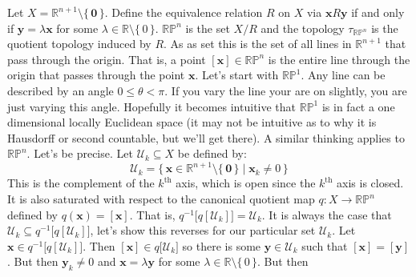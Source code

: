 \documentclass{article}
\theoremstyle{plain}
\theoremstyle{normal}
\newenvironment{example}{%
    \pushQED{\qed}\renewcommand{\qedsymbol}{$\blacksquare$}\examplex%
}{%
    \popQED\endexamplex%
}
\begin{document}
        \begin{example}[\textbf{Real Projective Space}]
            Let $X=\mathbb{R}^{n+1}\setminus\{\,\mathbf{0}\,\}$. Define the
            equivalence relation $R$ on $X$ via $\mathbf{x}R\mathbf{y}$ if and
            only if $\mathbf{y}=\lambda\mathbf{x}$ for some
            $\lambda\in\mathbb{R}\setminus\{\,0\,\}$. $\mathbb{RP}^{n}$ is the
            set $X/R$ and the topology $\tau_{\mathbb{RP}^{n}}$ is the
            quotient topology induced by $R$. As as set this is the set of all
            lines in $\mathbb{R}^{n+1}$ that pass through the origin. That is,
            a point $[\mathbf{x}]\in\mathbb{RP}^{n}$ is the entire line through
            the origin that passes through the point $\mathbf{x}$. Let's start
            with $\mathbb{RP}^{1}$. Any line can be described by an angle
            $0\leq\theta<\pi$. If you vary the line your are on slightly, you
            are just varying this angle. Hopefully it becomes intuitive that
            $\mathbb{RP}^{1}$ is in fact a one dimensional locally Euclidean
            space (it may not be intuitive as to why it is Hausdorff or
            second countable, but we'll get there). A similar thinking applies
            to $\mathbb{RP}^{n}$. Let's be precise. Let
            $\mathcal{U}_{k}\subseteq{X}$ be defined by:
            \begin{equation}
                \mathcal{U}_{k}
                =\{\,\mathbf{x}\in\mathbb{R}^{n+1}\setminus\{\,\mathbf{0}\,\}\;
                    |\;\mathbf{x}_{k}\ne{0}\,\}
            \end{equation}
            This is the complement of the $k^{\textrm{th}}$ axis, which is open
            since the $k^{\textrm{th}}$ axis is closed. It is also saturated
            with respect to the canonical quotient map
            $q:X\rightarrow\mathbb{RP}^{n}$ defined by
            $q(\mathbf{x})=[\mathbf{x}]$. That is,
            $q^{-1}\big[q[\mathcal{U}_{k}]\big]=\mathcal{U}_{k}$. It is always
            the case that
            $\mathcal{U}_{k}\subseteq{q}^{-1}\big[q[\mathcal{U}_{k}]\big]$,
            let's show this reverses for our particular set $\mathcal{U}_{k}$.
            Let $\mathbf{x}\in{q}^{-1}\big[q[\mathcal{U}_{k}]\big]$. Then
            $[\mathbf{x}]\in{q}\big[\mathcal{U}_{k}\big]$ so there is some
            $\mathbf{y}\in\mathcal{U}_{k}$ such that
            $[\mathbf{x}]=[\mathbf{y}]$. But then
            $\mathbf{y}_{k}\ne{0}$ and $\mathbf{x}=\lambda\mathbf{y}$ for some
            $\lambda\in\mathbb{R}\setminus\{\,0\,\}$. But then

\end{example}
\end{document}

